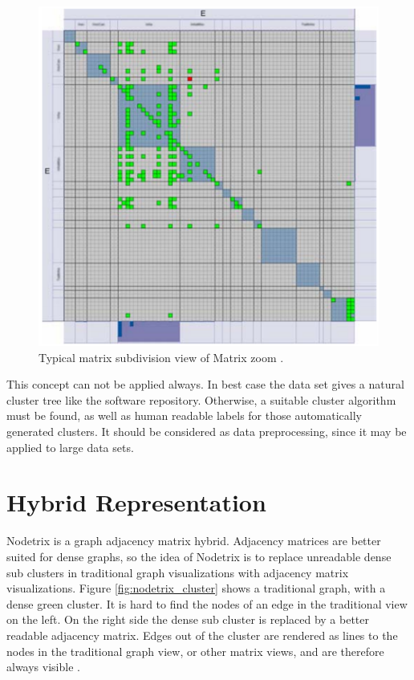 \begin{figure}[h]
\centering
\includegraphics[width=\textwidth/2]{images/matrixzoom_cluster}
\caption{Typical matrix subdivision view of Matrix zoom \citep{ham2005phd}. \label{fig:matrixzoom_cluster}}
\end{figure}

This concept can not be applied always. In best case the data set gives a natural cluster tree like the software repository. Otherwise, a suitable cluster algorithm must be found, as well as human readable labels for those automatically generated clusters. It should be considered as data preprocessing, since it may be applied to large data sets.













\section{Hybrid Representation}
Nodetrix is a graph adjacency matrix hybrid. Adjacency matrices are better suited for dense graphs, so the idea of Nodetrix is to replace unreadable dense sub clusters in traditional graph visualizations with adjacency matrix visualizations. Figure \ref{fig:nodetrix_cluster} shows a traditional graph, with a dense green cluster. It is hard to find the nodes of an edge in the traditional view on the left. On the right side the dense sub cluster is replaced by a better readable  adjacency matrix. Edges out of the cluster are rendered as lines to the nodes in the traditional graph view, or other matrix views, and are therefore always visible \citep{henry-nodetrix-2007}.



